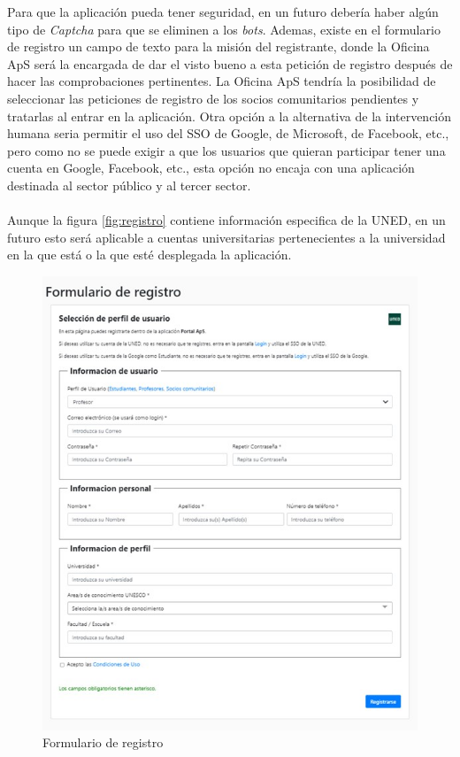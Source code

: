\documentclass[11pt]{book}
\begin{document}
 Para que la aplicación pueda tener seguridad, en un futuro debería haber algún tipo de \emph{Captcha} para que se eliminen a los \emph{bots}. Ademas, existe en el formulario de registro un campo de texto para la misión del registrante, donde la Oficina ApS será la encargada de dar el visto bueno a esta petición de registro después de hacer las comprobaciones pertinentes. La Oficina ApS tendría la posibilidad de seleccionar las peticiones de registro de los socios comunitarios pendientes y tratarlas al entrar en la aplicación. Otra opción a la alternativa de la intervención humana seria permitir el uso del SSO de Google, de Microsoft, de Facebook, etc., pero como no se puede exigir a que los usuarios que quieran participar tener una cuenta en Google, Facebook, etc., esta opción no encaja con una aplicación destinada al sector público y al tercer sector. \\\\
 Aunque la figura \ref{fig:registro} contiene información especifica de la UNED, en un futuro esto será aplicable a cuentas universitarias pertenecientes a la universidad en la que está o la que esté desplegada la aplicación.
 \begin{figure}[t]
 	\centering
 	\includegraphics[scale=0.7]{registro}
 	\caption{Formulario de registro}
 \end{figure}
\end{document}
